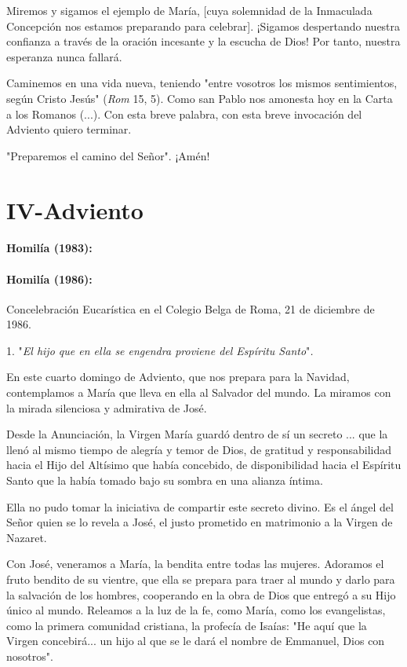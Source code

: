 Miremos y sigamos el ejemplo de María, {[}cuya solemnidad de la
Inmaculada Concepción nos estamos preparando para celebrar{]}. ¡Sigamos
despertando nuestra confianza a través de la oración incesante y la
escucha de Dios! Por tanto, nuestra esperanza nunca fallará.

Caminemos en una vida nueva, teniendo "entre vosotros los mismos
sentimientos, según Cristo Jesús" (\emph{Rom} 15, 5). Como san Pablo nos
amonesta hoy en la Carta a los Romanos (...). Con esta breve palabra,
con esta breve invocación del Adviento quiero terminar.

"Preparemos el camino del Señor". ¡Amén!

\chapter{IV-Adviento}

\subsubsection{Homilía (1983): }


\subsubsection{Homilía (1986): }

Concelebración Eucarística en el Colegio Belga de Roma, 21 de diciembre
de 1986.

1. "\emph{El hijo que en ella se engendra proviene del Espíritu
	Santo}"\emph{.}

En este cuarto domingo de Adviento, que nos prepara para la Navidad,
contemplamos a María que lleva en ella al Salvador del mundo. La miramos
con la mirada silenciosa y admirativa de José.

Desde la Anunciación, la Virgen María guardó dentro de sí un secreto ...
que la llenó al mismo tiempo de alegría y temor de Dios, de gratitud y
responsabilidad hacia el Hijo del Altísimo que había concebido, de
disponibilidad hacia el Espíritu Santo que la había tomado bajo su
sombra en una alianza íntima.

Ella no pudo tomar la iniciativa de compartir este secreto divino. Es el
ángel del Señor quien se lo revela a José, el justo prometido en
matrimonio a la Virgen de Nazaret.

Con José, veneramos a María, la bendita entre todas las mujeres.
Adoramos el fruto bendito de su vientre, que ella se prepara para traer
al mundo y darlo para la salvación de los hombres, cooperando en la obra
de Dios que entregó a su Hijo único al mundo. Releamos a la luz de la
fe, como María, como los evangelistas, como la primera comunidad
cristiana, la profecía de Isaías: "He aquí que la Virgen concebirá... un
hijo al que se le dará el nombre de Emmanuel, Dios con nosotros".

